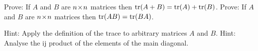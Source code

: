 
\begin{Exercise}[
name={},
title={}, 
difficulty=0,
origin={\cite{YL}}]
\Question Prove: If $A$ and $B$ are $n \! \times \! n$ matrices then $\operatorname{tr}(A+B)=\operatorname{tr}(A)+\operatorname{tr}(B)$.
\Question Prove: If $A$ and $B$ are $n \! \times \! n$ matrices then $\operatorname{tr}(AB)=\operatorname{tr}(BA)$.
\end{Exercise}

\begin{Answer}
\Question Hint: Apply the definition of the trace to arbitrary matrices $A$ and $B$.
\Question Hint: Analyse the ij product of the elements of the main diagonal.
\end{Answer}
